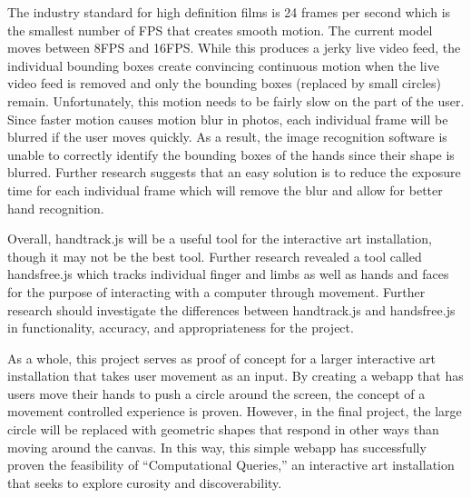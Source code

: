 \documentclass[10pt,twocolumn]{article}
\begin{document}
The industry standard for high definition films is 24 frames per second \cite{} which is the smallest number of FPS that creates smooth motion.  The current model moves between 8FPS and 16FPS. While this produces a jerky live video feed, the individual bounding boxes create convincing continuous motion when the live video feed is removed and only the bounding boxes (replaced by small circles) remain. Unfortunately, this motion needs to be fairly slow on the part of the user.  Since faster motion causes motion blur in photos, each individual frame will be blurred if the user moves quickly. As a result, the image recognition software is unable to correctly identify the bounding boxes of the hands since their shape is blurred. Further research suggests that an easy solution is to reduce the exposure time for each individual frame which will remove the blur \cite{} and allow for better hand recognition.   

Overall, handtrack.js will be a useful tool for the interactive art installation, though it may not be the best tool.  Further research revealed a tool called handsfree.js which tracks individual finger and limbs as well as hands and faces for the purpose of interacting with a computer through movement.  Further research should investigate the differences between handtrack.js and handsfree.js in functionality, accuracy, and appropriateness for the project.  

As a whole, this project serves as proof of concept for a larger interactive art installation that takes user movement as an input. By creating a webapp that has users move their hands to push a circle around the screen, the concept of a movement controlled experience is proven.  However, in the final project, the large circle will be replaced with geometric shapes that respond in other ways than moving around the canvas. In this way, this simple webapp has successfully proven the feasibility of ``Computational Queries,'' an interactive art installation that seeks to explore curosity and discoverability. 


\printbibliography 
\end{document}

